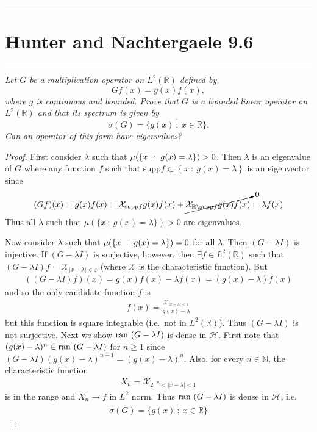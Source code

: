 \documentclass{article} %
\theoremstyle{plain}
\newcommand{\E}{\varepsilon}
\def\Rl{\mathbb{R}}
\newcommand{\ran}{\text{\rm ran }}
\newcommand{\Hilb}{\mathcal{H}}
\newcommand{\problem}[1]{
\vspace{.375cm}
\begin{minipage}{\textwidth}
    \begin{center}
        \noindent\rule{5cm}{1pt}
    \end{center}
    \section{\bf #1}
    \begin{center}
        \noindent\rule{5cm}{1pt}
    \end{center}
    \vspace{0.25cm}
\end{minipage}
}
\numberwithin{equation}{section} %
\numberwithin{figure}{section} %
\numberwithin{table}{section} %
\begin{document}
\problem{Hunter and Nachtergaele 9.6}
\emph{Let $G$ be a multiplication operator on $L^2(\Rl)$ defined by $$Gf(x) = g(x)f(x),$$ where $g$ is continuous and bounded.  Prove that $G$ is a bounded linear operator on $L^2(\Rl)$ and that its spectrum is given by $$\sigma(G) = \overline{\{g(x)\ :\ x \in \Rl\}}.$$  Can an operator of this form have eigenvalues?}
\begin{proof}
    First consider $\lambda$ such that $\mu\qty(\left\{x\ :\ g(x) = \lambda\right\}) > 0$.  Then $\lambda$ is an eigenvalue of $G$ where any function $f$ such that $\text{supp} f \subset \left\{x\ :\ g(x) = \lambda\right\}$ is an eigenvector since
    \begin{align*}
        (Gf)(x) = g(x)f(x) = \mathcal{X}_{\text{supp} f}g(x) f(x) + \cancelto{0}{\mathcal{X}_{\Rl\setminus\text{supp}f}g(x) f(x)} = \lambda f(x)
    \end{align*}
    Thus all $\lambda$ such that $\mu(\{x\ :\ g(x) = \lambda\}) > 0$ are eigenvalues.

    Now consider $\lambda$ such that $\mu\qty(\left\{x\ :\ g(x) = \lambda\right\}) = 0$ for all $\lambda$.  Then $(G - \lambda I)$ is injective.  If $(G - \lambda I)$ is surjective, however, then $\exists f \in L^2(\Rl)$ such that $(G - \lambda I)f = \mathcal{X}_{\left|x-\lambda\right|<\E}$ (where $\mathcal{X}$ is the characteristic function).  But
    \begin{align*}
        ((G - \lambda I)f)(x) = g(x)f(x) - \lambda f(x) = (g(x) - \lambda)f(x)
    \end{align*}
    and so the only candidate function $f$ is
    \begin{align*}
        f(x) = \frac{\mathcal{X}_{\left|x - \lambda\right| < 1}}{g(x) - \lambda}
    \end{align*}
    but this function is square integrable (i.e.~not in $L^2(\Rl)$).  Thus $(G - \lambda I)$ is not surjective.  Next we show $\ran(G - \lambda I)$ is dense in $\Hilb$.  First note that $(g(x) - \lambda)^n \in \ran(G - \lambda I)$ for $n \geq 1$ since $(G - \lambda I)(g(x) - \lambda)^{n-1} = (g(x) - \lambda)^n$.  Also, for every $n \in \mathbb{N}$, the characteristic function
    \begin{align*}
        X_n = \mathcal{X}_{2^{-n} < \left|x - \lambda\right| < 1}
    \end{align*}
    is in the range and $X_n \rightarrow f$ in $L^2$ norm.  Thus $\ran(G - \lambda I)$ is dense in $\Hilb$, i.e.
    \begin{align*}
        \sigma(G) = \overline{\{g(x)\ :\ x \in \Rl\}}
    \end{align*}
\end{proof}
\end{document}

